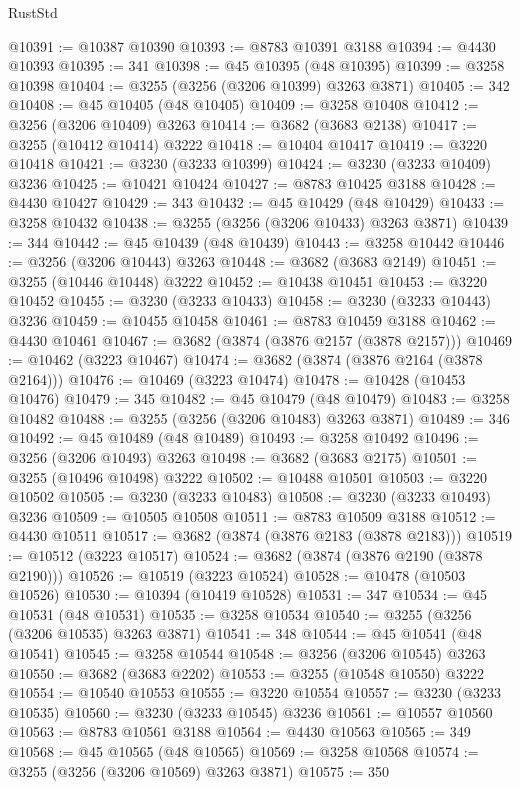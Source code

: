 \begin{lexlean}{RustStd}
\begin{coremodule}
@10391 := @10387 @10390
@10393 := @8783 @10391 @3188
@10394 := @4430 @10393
@10395 := 341
@10398 := @45 @10395 (@48 @10395)
@10399 := @3258 @10398
@10404 := @3255 (@3256 (@3206 @10399) @3263 @3871)
@10405 := 342
@10408 := @45 @10405 (@48 @10405)
@10409 := @3258 @10408
@10412 := @3256 (@3206 @10409) @3263
@10414 := @3682 (@3683 @2138)
@10417 := @3255 (@10412 @10414) @3222
@10418 := @10404 @10417
@10419 := @3220 @10418
@10421 := @3230 (@3233 @10399)
@10424 := @3230 (@3233 @10409) @3236
@10425 := @10421 @10424
@10427 := @8783 @10425 @3188
@10428 := @4430 @10427
@10429 := 343
@10432 := @45 @10429 (@48 @10429)
@10433 := @3258 @10432
@10438 := @3255 (@3256 (@3206 @10433) @3263 @3871)
@10439 := 344
@10442 := @45 @10439 (@48 @10439)
@10443 := @3258 @10442
@10446 := @3256 (@3206 @10443) @3263
@10448 := @3682 (@3683 @2149)
@10451 := @3255 (@10446 @10448) @3222
@10452 := @10438 @10451
@10453 := @3220 @10452
@10455 := @3230 (@3233 @10433)
@10458 := @3230 (@3233 @10443) @3236
@10459 := @10455 @10458
@10461 := @8783 @10459 @3188
@10462 := @4430 @10461
@10467 := @3682 (@3874 (@3876 @2157 (@3878 @2157)))
@10469 := @10462 (@3223 @10467)
@10474 := @3682 (@3874 (@3876 @2164 (@3878 @2164)))
@10476 := @10469 (@3223 @10474)
@10478 := @10428 (@10453 @10476)
@10479 := 345
@10482 := @45 @10479 (@48 @10479)
@10483 := @3258 @10482
@10488 := @3255 (@3256 (@3206 @10483) @3263 @3871)
@10489 := 346
@10492 := @45 @10489 (@48 @10489)
@10493 := @3258 @10492
@10496 := @3256 (@3206 @10493) @3263
@10498 := @3682 (@3683 @2175)
@10501 := @3255 (@10496 @10498) @3222
@10502 := @10488 @10501
@10503 := @3220 @10502
@10505 := @3230 (@3233 @10483)
@10508 := @3230 (@3233 @10493) @3236
@10509 := @10505 @10508
@10511 := @8783 @10509 @3188
@10512 := @4430 @10511
@10517 := @3682 (@3874 (@3876 @2183 (@3878 @2183)))
@10519 := @10512 (@3223 @10517)
@10524 := @3682 (@3874 (@3876 @2190 (@3878 @2190)))
@10526 := @10519 (@3223 @10524)
@10528 := @10478 (@10503 @10526)
@10530 := @10394 (@10419 @10528)
@10531 := 347
@10534 := @45 @10531 (@48 @10531)
@10535 := @3258 @10534
@10540 := @3255 (@3256 (@3206 @10535) @3263 @3871)
@10541 := 348
@10544 := @45 @10541 (@48 @10541)
@10545 := @3258 @10544
@10548 := @3256 (@3206 @10545) @3263
@10550 := @3682 (@3683 @2202)
@10553 := @3255 (@10548 @10550) @3222
@10554 := @10540 @10553
@10555 := @3220 @10554
@10557 := @3230 (@3233 @10535)
@10560 := @3230 (@3233 @10545) @3236
@10561 := @10557 @10560
@10563 := @8783 @10561 @3188
@10564 := @4430 @10563
@10565 := 349
@10568 := @45 @10565 (@48 @10565)
@10569 := @3258 @10568
@10574 := @3255 (@3256 (@3206 @10569) @3263 @3871)
@10575 := 350

\end{coremodule}
\end{lexlean}
